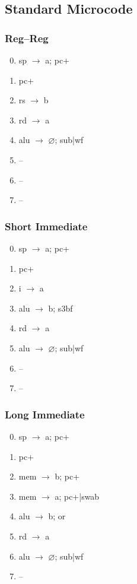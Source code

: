 \documentclass[11pt]{book}
\let\emptyset\varnothing
\begin{document}
\subsection*{Standard Microcode}
\begin{multicols}{3}\ttfamily\selectfont\small
  \subsubsection*{Reg--Reg}
  \begin{enumerate}\setcounter{enumi}{-1}
  \item sp \(\rightarrow\) a; pc+
  \item pc+
  \item rs \(\rightarrow\) b
  \item rd \(\rightarrow\) a
  \item alu \(\rightarrow\) \(\emptyset\); sub|wf
  \item --
  \item --
  \item --
  \end{enumerate}
  \columnbreak
  \subsubsection*{Short Immediate}
  \begin{enumerate}\setcounter{enumi}{-1}
  \item sp \(\rightarrow\) a; pc+
  \item pc+
  \item i \(\rightarrow\) a
  \item alu \(\rightarrow\) b; s3bf
  \item rd \(\rightarrow\) a
  \item alu \(\rightarrow\) \(\emptyset\); sub|wf
  \item --
  \item --
  \end{enumerate}
  \columnbreak
  \subsubsection*{Long Immediate}
  \begin{enumerate}\setcounter{enumi}{-1}
  \item sp \(\rightarrow\) a; pc+
  \item pc+
  \item mem \(\rightarrow\) b; pc+
  \item mem \(\rightarrow\) a; pc+|swab
  \item alu \(\rightarrow\) b; or
  \item rd \(\rightarrow\) a
  \item alu \(\rightarrow\) \(\emptyset\); sub|wf
  \item --
  \end{enumerate}
\end{multicols}
\end{document}
